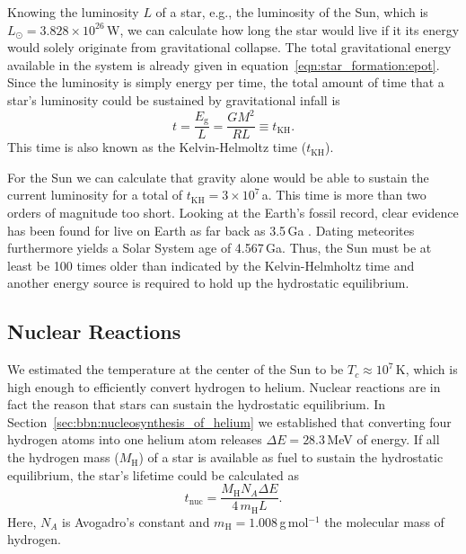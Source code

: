 Knowing the luminosity $L$ of a star, e.g., the luminosity of the Sun, which is $L_\odot = 3.828\times10^{26}$\,W, we can calculate how long the star would live if it its energy would solely originate from gravitational collapse. The total gravitational energy available in the system is already given in equation~\eqref{eqn:star_formation:epot}. Since the luminosity is simply energy per time, the total amount of time that a star's luminosity could be sustained by gravitational infall is
\begin{equation}
    t = \frac{E_\mathrm{g}}{L} = \frac{GM^2}{RL} \equiv t_\mathrm{KH}.
    \label{eqn:star_formation:kelvin_helmholtz_time}
\end{equation}
This time is also known as the Kelvin-Helmoltz time ($t_\mathrm{KH}$). 

For the Sun we can calculate that gravity alone would be able to sustain the current luminosity for a total of $t_\mathrm{KH} = 3\times10^{7}$\,a. This time is more than two orders of magnitude too short. Looking at the Earth's fossil record, clear evidence has been found for live on Earth as far back as 3.5\,Ga \citep{schopf07}. Dating meteorites furthermore yields a Solar System age of 4.567\,Ga. Thus, the Sun must be at least be 100 times older than indicated by the Kelvin-Helmholtz time and another energy source is required to hold up the hydrostatic equilibrium.


\subsection{Nuclear Reactions}

We estimated the temperature at the center of the Sun to be $T_c \approx 10^7$\,K, which is high enough to efficiently convert hydrogen to helium. Nuclear reactions are in fact the reason that stars can sustain the hydrostatic equilibrium. In Section~\ref{sec:bbn:nucleosynthesis_of_helium} we established that converting four hydrogen atoms into one helium atom releases $\Delta E = 28.3$\,MeV of energy. If all the hydrogen mass ($M_\mathrm{H}$) of a star is available as fuel to sustain the hydrostatic equilibrium, the star's lifetime could be calculated as
\begin{equation}
    t_\mathrm{nuc} = \frac{M_\mathrm{H} N_A \Delta E}{4\,m_\mathrm{H} L}.
    \label{eqn:star_formation:nuclear_lifetime}
\end{equation}
Here, $N_A$ is Avogadro's constant and $m_\mathrm{H} = 1.008\,$g\,mol$^{-1}$ the molecular mass of hydrogen.

